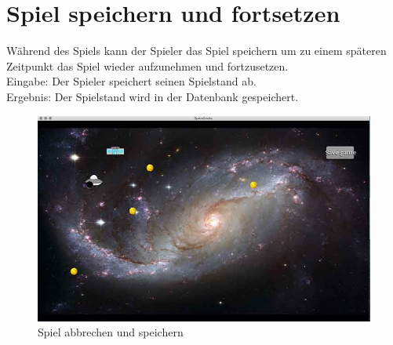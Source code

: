 \documentclass[12pt]{article}
\begin{document}
\newpage
\section{Spiel speichern und fortsetzen}
Während des Spiels kann der Spieler das Spiel speichern um zu einem späteren Zeitpunkt das Spiel wieder aufzunehmen und fortzusetzen.\\
Eingabe: Der Spieler speichert seinen Spielstand ab.\\
Ergebnis: Der Spielstand wird in der Datenbank gespeichert.\\
\begin{figure}[htp]
	\centering
	\includegraphics[scale=0.6]{TestProtocolBilder/continue1@0,25x.jpg}
	\caption{Spiel abbrechen und speichern}
\end{figure}
\end{document}
